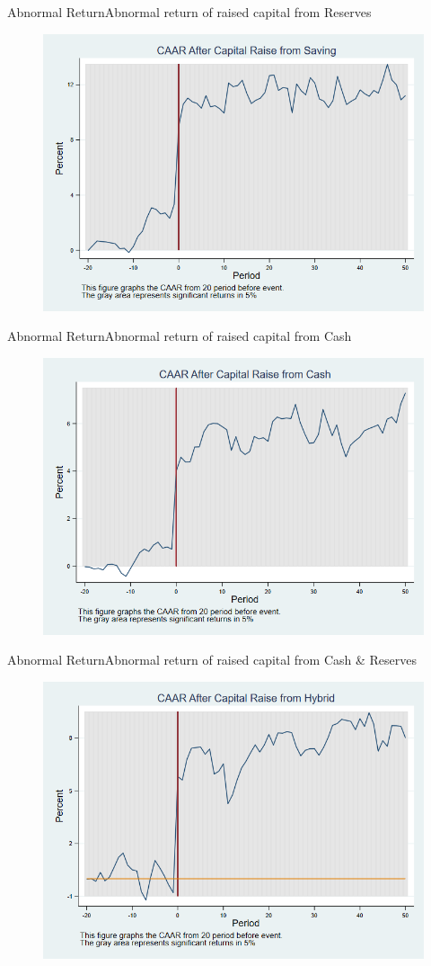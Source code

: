 \documentclass{beamer}
\begin{document}
\begin{frame}{Abnormal Return}{Abnormal return of raised capital from Reserves}
\label{car_marketSaving}
\begin{figure}
\centering
\includegraphics[width=0.65\linewidth]{Output/car_marketSaving}
\label{fig:car_marketSaving}
\end{figure}

\end{frame}


\begin{frame}{Abnormal Return}{Abnormal return of raised capital from Cash}
\label{car_marketCash}
\begin{figure}
\centering
\includegraphics[width=0.65\linewidth]{Output/car_marketCash}
\label{fig:car_marketCash}
\end{figure}
\end{frame}


\begin{frame}{Abnormal Return}{Abnormal return of raised capital from Cash \& Reserves}
\label{car_marketHybrid}
\begin{figure}
\centering
\includegraphics[width=0.65\linewidth]{Output/car_marketHybrid}
\label{fig:car_marketHybrid}
\end{figure}
\end{frame}
\end{document}

